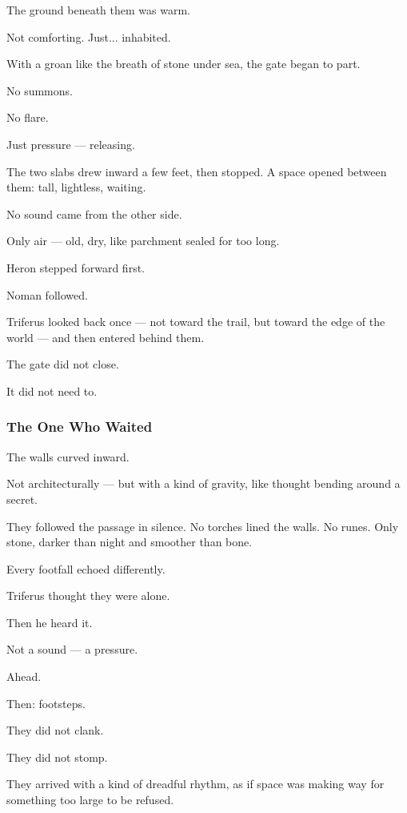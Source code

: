 \documentclass[12pt]{article}
\begin{document}
The ground beneath them was warm.

Not comforting. Just... inhabited.

\bigskip

With a groan like the breath of stone under sea, the gate began to part.

No summons.

No flare.

Just pressure — releasing.

The two slabs drew inward a few feet, then stopped. A space opened between them: tall, lightless, waiting.

No sound came from the other side.

Only air — old, dry, like parchment sealed for too long.

Heron stepped forward first.

Noman followed.

Triferus looked back once — not toward the trail, but toward the edge of the world — and then entered behind them.

\bigskip

The gate did not close.

It did not need to.

\dotfill

\subsubsection*{The One Who Waited}

The walls curved inward.

Not architecturally — but with a kind of gravity, like thought bending around a secret.

They followed the passage in silence. No torches lined the walls. No runes. Only stone, darker than night and smoother than bone.

Every footfall echoed differently.

Triferus thought they were alone.

Then he heard it.

Not a sound — a pressure.

Ahead.

Then: footsteps.

\bigskip

They did not clank.

They did not stomp.

They arrived with a kind of dreadful rhythm, as if space was making way for something too large to be refused.
\end{document}
